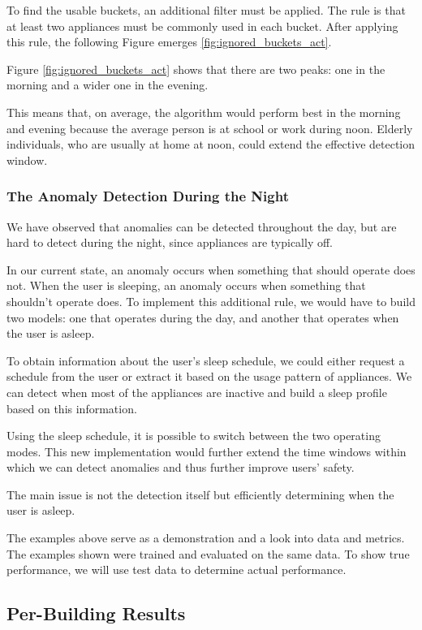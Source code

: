 To find the usable buckets, an additional filter must be applied.
The rule is that at least two appliances must be commonly used in each bucket. 
After applying this rule, the following Figure emerges \ref{fig:ignored_buckets_act}.

Figure \ref{fig:ignored_buckets_act} shows that there are two peaks:
one in the morning and a wider one in the evening.

This means that, on average, the algorithm would perform best in the morning and evening because the average person is at school or work during noon. 
Elderly individuals, who are usually at home at noon, could extend the effective detection window.

\subsubsection{The Anomaly Detection During the Night}

We have observed that anomalies can be detected throughout the day,
but are hard to detect during the night, since appliances are typically off.

In our current state, an anomaly occurs when something that should operate does not.
When the user is sleeping, an anomaly occurs when something that shouldn't operate does. 
To implement this additional rule, we would have to build two models:
one that operates during the day, and another that operates when the user is asleep.

To obtain information about the user's sleep schedule, we could either request a schedule from the user or extract it based on the usage pattern of appliances.
We can detect when most of the appliances are inactive and build a sleep profile based on this information.

Using the sleep schedule, it is possible to switch between the two operating modes. 
This new implementation would further extend the time windows within which we can detect anomalies and thus further improve users' safety.

The main issue is not the detection itself but efficiently determining
when the user is asleep. 

The examples above serve as a demonstration and a look into data and metrics. 
The examples shown were trained and evaluated on the same data. 
To show true performance, we will use test data to determine actual performance. 

\subsection{Per-Building Results}
